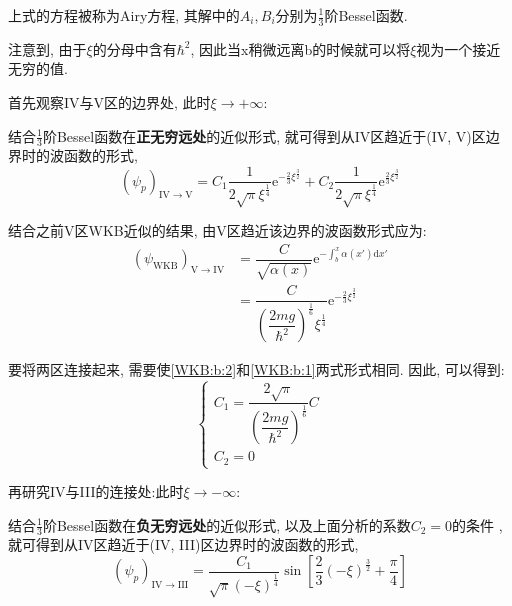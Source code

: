\documentclass[a4paper, 11pt]{article}
\begin{document}
\begin{spacing}{1.2}
          上式的方程被称为Airy方程, 其解中的$A_i, B_i$分别为$\frac{1}{3}$阶Bessel函数. 

          注意到, 由于$\xi$的分母中含有$\hbar^2$, 因此当x稍微远离b的时候就可以将$\xi$视为一个接近无穷的值.

          首先观察IV与V区的边界处, 此时$\xi\to+\infty$:

          结合$\frac{1}{3}$阶Bessel函数在\textbf{正无穷远处}的近似形式, 就可得到从IV区趋近于(IV, V)区边界时的波函数的形式,
          \begin{equation}
            \label{WKB:b:2}
            (\psi_p)_{\mathrm{IV}\to{}\mathrm{V}} = C_1\dfrac{1}{2\sqrt{\pi}\xi^{\frac{1}{4}}}\mathrm{e}^{-\frac{2}{3}\xi^{\frac{3}{2}}}+%
                     C_2\dfrac{1}{2\sqrt{\pi}\xi^{\frac{1}{4}}}\mathrm{e}^{\frac{2}{3}\xi^{\frac{3}{2}}}
          \end{equation}

          结合之前V区WKB近似的结果, 由V区趋近该边界的波函数形式应为:
          \begin{equation}
            \label{WKB:b:1}
            \begin{aligned}
              (\psi_{\mathrm{WKB}})_{\mathrm{V}\to{}\mathrm{IV}} &= \dfrac{C}{\sqrt{\alpha(x)}}\mathrm{e}^{-\int_b^x\alpha(x')\mathrm{d}x'}\\
                                        &= \dfrac{C}{\left(\dfrac{2mg}{\hbar^2}\right)^{\frac{1}{6}}\xi^{\frac{1}{4}}}\mathrm{e}^{-\frac{2}{3}\xi^{\frac{3}{2}}}
            \end{aligned}
          \end{equation} 

          要将两区连接起来, 需要使\eqref{WKB:b:2}和\eqref{WKB:b:1}两式形式相同. 因此, 可以得到:
          \begin{equation}
            \label{WKB:connect:1}
            \left\{\begin{array}{l}
              C_1 = \dfrac{2\sqrt{\pi}}{\left(\dfrac{2mg}{\hbar^2}\right)^{\frac{1}{6}}}C\\
              C_2 = 0
            \end{array}\right.
          \end{equation}

          再研究IV与III的连接处:此时$\xi\to-\infty$:
          
          结合$\frac{1}{3}$阶Bessel函数在\textbf{负无穷远处}的近似形式, 以及上面分析的系数$C_2=0$的条件 
          ,就可得到从IV区趋近于(IV, III)区边界时的波函数的形式,
          \begin{equation}
            \label{WKB:b:3}
            (\psi_p)_{\mathrm{IV}\to\mathrm{III}} = \dfrac{C_1}{\sqrt{\pi}(-\xi)^{\frac{1}{4}}}%
            \sin\left[\dfrac{2}{3}(-\xi)^{\frac{3}{2}}+\dfrac{\pi}{4}\right]
          \end{equation}


\end{spacing}
\end{document}
